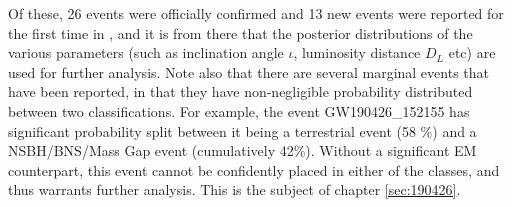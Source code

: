     Of these, 26 events were officially confirmed and 13 new events were reported for
    the first time in \cite{abbott_2020A}, and it is from there that the posterior
    distributions of the various parameters (such as inclination angle $\iota$,
    luminosity distance $D_L$ etc) are used for further analysis.  Note also that there
    are several marginal events that have been reported, in that they have
    non-negligible probability distributed between two classifications. For example, the
    event GW190426\_152155 has significant probability split between it being a
    terrestrial event (58 \%) and a NSBH/BNS/Mass Gap event (cumulatively 42\%). Without
    a significant EM counterpart, this event cannot be confidently placed in either of
    the classes, and thus warrants further analysis. This is the subject of chapter
    \ref{sec:190426}.


